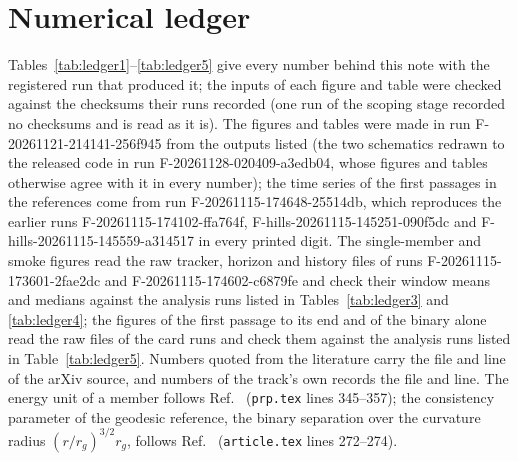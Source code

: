 \documentclass[aps,prd,twocolumn,10pt,superscriptaddress,nofootinbib,longbibliography,floatfix]{revtex4-2}
\begin{document}


\section{Numerical ledger}\label{app:ledger}

Tables~\ref{tab:ledger1}--\ref{tab:ledger5} give every number behind this note with the registered run that produced it; the inputs of each figure and table were checked against the checksums their runs recorded (one run of the scoping stage recorded no checksums and is read as it is). The figures and tables were made in run F-20261121-214141-256f945 from the outputs listed (the two schematics redrawn to the released code in run F-20261128-020409-a3edb04, whose figures and tables otherwise agree with it in every number); the time series of the first passages in the references come from run F-20261115-174648-25514db, which reproduces the earlier runs F-20261115-174102-ffa764f, F-hills-20261115-145251-090f5dc and F-hills-20261115-145559-a314517 in every printed digit. The single-member and smoke figures read the raw tracker, horizon and history files of runs F-20261115-173601-2fae2dc and F-20261115-174602-c6879fe and check their window means and medians against the analysis runs listed in Tables~\ref{tab:ledger3} and \ref{tab:ledger4}; the figures of the first passage to its end and of the binary alone read the raw files of the card runs and check them against the analysis runs listed in Table~\ref{tab:ledger5}. Numbers quoted from the literature carry the file and line of the arXiv source, and numbers of the track's own records the file and line. The energy unit of a member follows Ref.~\cite{Sari:2010hills} (\texttt{prp.tex} lines 345--357); the consistency parameter of the geodesic reference, the binary separation over the curvature radius $(r/r_g)^{3/2}r_g$, follows Ref.~\cite{Manzaneda:2024geodesic} (\texttt{article.tex} lines 272--274).




\end{document}
